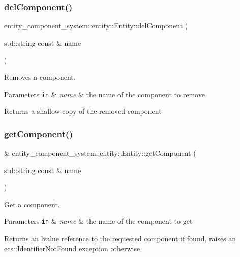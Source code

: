 \subsubsection{del\+Component()}
{\footnotesize{} entity\+\_\+component\+\_\+system\+::entity\+::\+Entity\+::del\+Component (\begin{DoxyParamCaption}\item[{std\+::string const \&}]{name }\end{DoxyParamCaption})}



Removes a component. 


\begin{DoxyParams}[1]{Parameters}
\mbox{\tt in}  & {\em name} & the name of the component to remove \\
\hline
\end{DoxyParams}
\begin{DoxyReturn}{Returns}
a shallow copy of the removed component 
\end{DoxyReturn}
\label{classentity__component__system_1_1entity_1_1_entity_a041668e84e845f1e1a19059b080d9dfe} 
\subsubsection{get\+Component()\hspace{0.1cm}{\footnotesize\ttfamily [1/2]}}
{\footnotesize{} \& entity\+\_\+component\+\_\+system\+::entity\+::\+Entity\+::get\+Component (\begin{DoxyParamCaption}\item[{std\+::string const \&}]{name }\end{DoxyParamCaption})}



Get a component. 


\begin{DoxyParams}[1]{Parameters}
\mbox{\tt in}  & {\em name} & the name of the component to get \\
\hline
\end{DoxyParams}
\begin{DoxyReturn}{Returns}
an lvalue reference to the requested component if found, raises an ecs\+::\+Identifier\+Not\+Found exception otherwise 
\end{DoxyReturn}
\label{classentity__component__system_1_1entity_1_1_entity_af82574053d544c2aa236d0cda0d87a49} 
